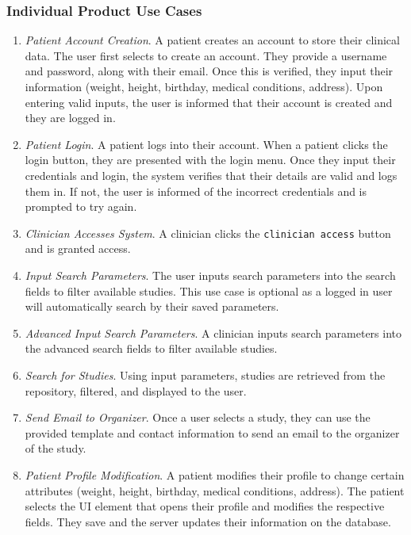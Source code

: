 \documentclass[12pt, titlepage]{article}
\begin{document}
\subsubsection{Individual Product Use Cases}

\begin{enumerate}

\item \textit{Patient Account Creation}. A patient creates an account to store their clinical data. The user first selects to create an account. They provide a username and password, along with their email. Once this is verified, they input their information (weight, height, birthday, medical conditions, address). Upon entering valid inputs, the user is informed that their account is created and they are logged in.

\item \textit{Patient Login}. A patient logs into their account. When a patient clicks the login button, they are presented with the login menu. Once they input their credentials and login, the system verifies that their details are valid and logs them in. If not, the user is informed of the incorrect credentials and is prompted to try again.

\item \textit{Clinician Accesses System}. A clinician clicks the \texttt{clinician access} button and is granted access.

\item \textit{Input Search Parameters}. The user inputs search parameters into the search fields to filter available studies. This use case is optional as a logged in user will automatically search by their saved parameters.

\item \textit{Advanced Input Search Parameters}. A clinician inputs search parameters into the advanced search fields to filter available studies.

\item \textit{Search for Studies}. Using input parameters, studies are retrieved from the repository, filtered, and displayed to the user. 

\item \textit{Send Email to Organizer}. Once a user selects a study, they can use the provided template and contact information to send an email to the organizer of the study.

\item \textit{Patient Profile Modification}. A patient modifies their profile to change certain attributes (weight, height, birthday, medical conditions, address). The patient selects the UI element that opens their profile and modifies the respective fields. They save and the server updates their information on the database. 


\end{enumerate}
\end{document}
